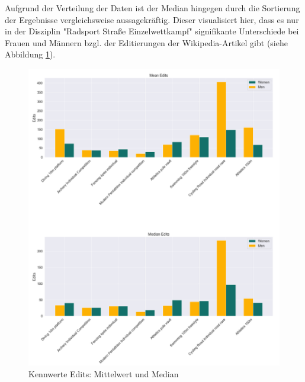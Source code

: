 \documentclass[11pt]{article}
\begin{document}
Aufgrund der Verteilung der Daten ist der Median hingegen durch die Sortierung der Ergebnisse vergleichsweise aussagekräftig. Dieser visualisiert hier, dass es nur in der Disziplin "Radsport Straße Einzelwettkampf" signifikante Unterschiede bei Frauen und Männern bzgl. der Editierungen der Wikipedia-Artikel gibt (siehe Abbildung \ref{fig:editcountMeanMedian}).

\begin{figure}
\includegraphics[width=1\textwidth]{figures/editcount_mean_median.png}
\caption[Kennwerte Editierungen: Mittelwert und Median]{Kennwerte Edits: Mittelwert und Median}
\label{fig:editcountMeanMedian}
\end{figure}
\end{document}
